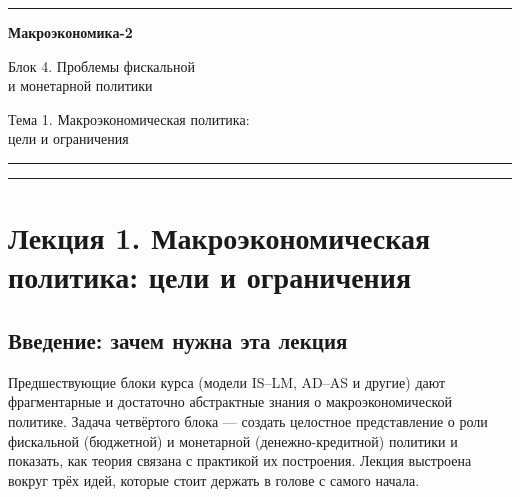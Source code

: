 \documentclass[11pt,a4paper]{article}
\begin{document}
\begin{titlepage}
    \thispagestyle{empty}
    \centering

    \textcolor{mainblue}{\rule{\textwidth}{1.2pt}}

    \vspace{1.2cm}

    {\color{mainblue}\Huge\bfseries Макроэкономика-2\par}

    \vspace{0.6cm}

    {\color{mainblue}\Large Блок 4. Проблемы фискальной\\ и монетарной политики\par}

    \vspace{0.6cm}

    {\color{mainblue}\large Тема 1. Макроэкономическая политика:\\ цели и ограничения\par}

    \vspace{0.6cm}

    \textcolor{mainblue}{\rule{\textwidth}{0.4pt}}

    \vfill


    \vspace{1cm}

    \textcolor{mainblue}{\rule{\textwidth}{1.2pt}}
\end{titlepage}

\newpage
\tableofcontents
\newpage

\section{Лекция 1. Макроэкономическая политика: цели и ограничения}

\subsection{Введение: зачем нужна эта лекция}

Предшествующие блоки курса (модели IS--LM, AD--AS и другие) дают фрагментарные и достаточно абстрактные знания о макроэкономической политике. Задача четвёртого блока --- создать целостное представление о роли фискальной (бюджетной) и монетарной (денежно-кредитной) политики и показать, как теория связана с практикой их построения. Лекция выстроена вокруг трёх идей, которые стоит держать в голове с самого начала.
\end{document}
